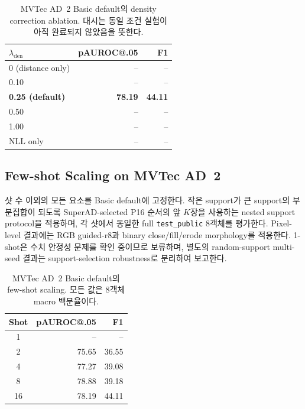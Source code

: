 \begin{table}[t]
  \centering
  \caption{MVTec AD~2 Basic default의 density correction ablation. 대시는
  동일 조건 실험이 아직 완료되지 않았음을 뜻한다.}
  \label{tab:density_correction}
  \small
  \begin{tabular}{@{}lrr@{}}
    \toprule
    $\lambda_{\mathrm{den}}$ & pAUROC@.05 & F1 \\
    \midrule
    0 (distance only) & -- & -- \\
    0.10              & -- & -- \\
    \textbf{0.25 (default)} & \textbf{78.19} & \textbf{44.11} \\
    0.50              & -- & -- \\
    1.00              & -- & -- \\
    NLL only          & -- & -- \\
    \bottomrule
  \end{tabular}
\end{table}

\subsection{Few-shot Scaling on MVTec AD~2}

샷 수 이외의 모든 요소를 Basic default에 고정한다. 작은 support가 큰 support의
부분집합이 되도록 SuperAD-selected P16 순서의 앞 $K$장을 사용하는 nested
support protocol을 적용하며, 각 샷에서 동일한 full \texttt{test\_public} 8객체를
평가한다. Pixel-level 결과에는 RGB guided-r8과 binary
close/fill/erode morphology를 적용한다. 1-shot은 수치 안정성 문제를 확인 중이므로
보류하며, 별도의 random-support multi-seed 결과는 support-selection robustness로
분리하여 보고한다.

\begin{table}[t]
  \centering
  \caption{MVTec AD~2 Basic default의 few-shot scaling. 모든 값은 8객체
  macro 백분율이다.}
  \label{tab:ad2_shot_scaling}
  \small
  \begin{tabular}{@{}crr@{}}
    \toprule
    Shot & pAUROC@.05 & F1 \\
    \midrule
    1  & -- & -- \\
    2  & 75.65 & 36.55 \\
    4  & 77.27 & 39.08 \\
    8  & 78.88 & 39.18 \\
    16 & 78.19 & 44.11 \\
    \bottomrule
  \end{tabular}
\end{table}

